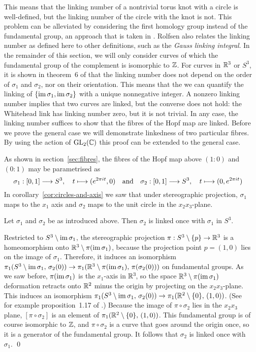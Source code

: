 This means that the linking number of a nontrivial torus knot with a circle
is well-defined,
but the linking number of the circle with the knot is not.
This problem can be alleviated by considering the first homology group
instead of the fundamental group,
an approach that is taken in \parencite[p.~132]{rolfsen2003}.
Rolfsen also relates the linking number as defined here to other definitions,
such as the \emph{Gauss linking integral}.
In the remainder of this section,
we will only consider curves of which the fundamental group of the complement is isomorphic to $\mathbb{Z}$.
For curves in $\mathbb{R}^3$ or $S^3\!$,
it is shown in theorem~6 of \parencite[p.~135]{rolfsen2003}
that the linking number
does not depend on the order of $\sigma_1$ and $\sigma_2$,
nor on their orientation.
This means that the we can quantify the linking of $\{ \operatorname{im} \sigma_1, \operatorname{im} \sigma_2 \}$
with a unique nonnegative integer.
A nonzero linking number implies that two curves are linked,
but the converse does not hold:
the Whitehead link has linking number zero,
but it is not trivial.
In any case,
the linking number suffices to show that the fibres of the Hopf map are linked.
Before we prove the general case
we will demonstrate linkedness of two particular fibres.
By using the action of $\operatorname{GL}_2(\mathbb{C})$
this proof can be extended to the general case.

As shown in section~\ref{sec:fibres},
the fibres of the Hopf map above $(1 : 0)$ and $(0 : 1)$ may be parametrised as
\[ \sigma_1: [0, 1] \longrightarrow S^3, \quad t \longmapsto (e^{2\pi i t}, 0)
   \quad \textup{and} \quad
   \sigma_2: [0, 1] \longrightarrow S^3, \quad t \longmapsto (0, e^{2\pi i t}) \]
In corollary~\ref{cor:circles-and-axis} we saw that under stereographic projection,
$\sigma_1$ maps to the $x_1$ axis
and $\sigma_2$ maps to the unit circle in the $x_2 x_3$-plane.

\proposition
Let $\sigma_1$ and $\sigma_2$ be as introduced above.
Then $\sigma_2$ is linked once with $\sigma_1$ in $S^3\!$.

\proof
Restricted to $S^3 \setminus \operatorname{im} \sigma_1$,
the stereographic projection $\pi : S^3 \setminus\{ p \} \to \mathbb{R}^3$
is a homeomorphism onto $\mathbb{R}^3 \setminus \pi(\operatorname{im} \sigma_1)$,
because the projection point $p = (1, 0)$ lies on the image of $\sigma_1$.
Therefore, it induces an isomorphism
$\pi_1(S^3 \setminus \operatorname{im} \sigma_1, \, \sigma_2(0)) \to \pi_1(\mathbb{R}^3 \setminus \pi(\operatorname{im} \sigma_1), \, \pi(\sigma_2(0)))$
on fundamental groups.
As we saw before, $\pi(\operatorname{im} \sigma_1)$ is the $x_1$-axis in $\mathbb{R}^3\!$,
so the space $\mathbb{R}^3 \setminus \pi(\operatorname{im} \sigma_1)$ deformation retracts onto $\mathbb{R}^2$ minus the origin
by projecting on the $x_2 x_3$-plane.
This induces an isomorphism
$\pi_1(S^3 \setminus \operatorname{im} \sigma_1, \, \sigma_2(0)) \to \pi_1(\mathbb{R}^2 \setminus \{ 0 \},\, (1, 0))$.
(See for example proposition~1.17 of \parencite[p.~31]{hatcher2002}.)
Because the image of $\pi \circ \sigma_2$ lies in the $x_2x_3$ plane,
$[\pi \circ \sigma_2]$ is an element of $\pi_1(\mathbb{R}^2 \setminus \{ 0 \},\, (1, 0))$.
This fundamental group is of course isomorphic to $\mathbb{Z}$,
and $\pi \circ \sigma_2$ is a curve that goes around the origin once,
so it is a generator of the fundamental group.
It follows that $\sigma_2$ is linked once with $\sigma_1$.
\qed

